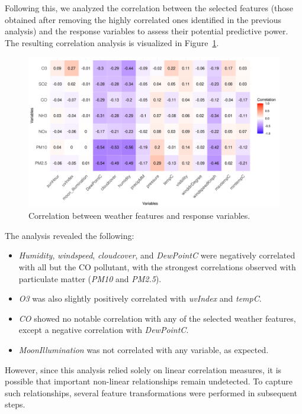 \documentclass[twoside,11pt]{article}
\begin{document}
Following this, we analyzed the correlation between the selected features (those obtained after removing the highly correlated ones identified in the previous analysis) and the response variables to assess their potential predictive power. The resulting correlation analysis is visualized in Figure~\ref{fig:feature_response_correlation}.

\begin{figure}[H]
  \centering
  \includegraphics[width=\textwidth]{assets/feature-response-correlation.png}
  \caption{Correlation between weather features and response variables.}
  \label{fig:feature_response_correlation}
\end{figure}

The analysis revealed the following:
\begin{itemize}
    \item \textit{Humidity}, \textit{windspeed}, \textit{cloudcover}, and \textit{DewPointC} were negatively correlated with all but the CO pollutant, with the strongest correlations observed with particulate matter (\textit{PM10} and \textit{PM2.5}).
    \item \textit{O3} was also slightly positively correlated with \textit{uvIndex} and \textit{tempC}.
    \item \textit{CO} showed no notable correlation with any of the selected weather features, except a negative correlation with \textit{DewPointC}.
    \item \textit{MoonIllumination} was not correlated with any variable, as expected.
\end{itemize}

However, since this analysis relied solely on linear correlation measures, it is possible that important non-linear relationships remain undetected. To capture such relationships, several feature transformations were performed in subsequent steps.
\end{document}
